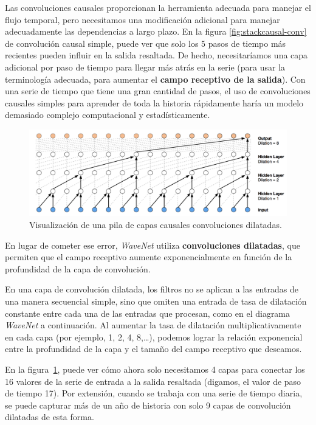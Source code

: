 \documentclass[a4paper,12pt]{article}
\begin{document}
Las convoluciones causales proporcionan la herramienta adecuada para manejar el flujo temporal, pero necesitamos una modificación adicional para manejar adecuadamente las dependencias a largo plazo. En la figura \ref{fig:stackcausal-conv} de convolución causal simple, puede ver que solo los 5 pasos de tiempo más recientes pueden influir en la salida resaltada. De hecho, necesitaríamos una capa adicional por paso de tiempo para llegar más atrás en la serie (para usar la terminología adecuada, para aumentar el \textbf{campo receptivo de la salida}). Con una serie de tiempo que tiene una gran cantidad de pasos, el uso de convoluciones causales simples para aprender de toda la historia rápidamente haría un modelo demasiado complejo computacional y estadísticamente.

\begin{figure}[H]
	\begin{center}				
	\includegraphics[width=1\textwidth]{dilated-conv.png}
  	\caption{Visualización de una pila de capas causales convoluciones dilatadas.}
  	\label{fig:dilated-conv}
  	\end{center}
\end{figure}

En lugar de cometer ese error, \textit{WaveNet} utiliza \textbf{convoluciones dilatadas}, que permiten que el campo receptivo aumente exponencialmente en función de la profundidad de la capa de convolución. 

En una capa de convolución dilatada, los filtros no se aplican a las entradas de una manera secuencial simple, sino que omiten una entrada de tasa de dilatación constante entre cada una de las entradas que procesan, como en el diagrama \textit{WaveNet} a continuación. Al aumentar la tasa de dilatación multiplicativamente en cada capa (por ejemplo, 1, 2, 4, 8,…), podemos lograr la relación exponencial entre la profundidad de la capa y el tamaño del campo receptivo que deseamos. 

En la figura~\ref{fig:dilated-conv}, puede ver cómo ahora solo necesitamos 4 capas para conectar los 16 valores de la serie de entrada a la salida resaltada (digamos, el valor de paso de tiempo 17). Por extensión, cuando se trabaja con una serie de tiempo diaria, se puede capturar más de un año de historia con solo 9 capas de convolución dilatadas de esta forma.
\end{document}
